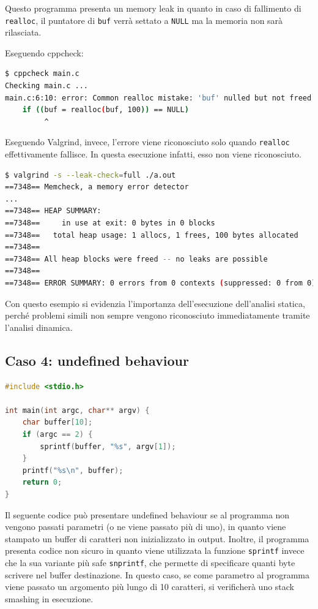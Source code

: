\documentclass{article}
\begin{document}
Questo programma presenta un memory leak in quanto in caso di fallimento
di \texttt{realloc}, il puntatore di \texttt{buf} verrà settato a \texttt{NULL}
ma la memoria non sarà rilasciata.

Eseguendo cppcheck:

\begin{lstlisting}[language=bash]
$ cppcheck main.c
Checking main.c ...
main.c:6:10: error: Common realloc mistake: 'buf' nulled but not freed upon failure [memleakOnRealloc]
    if ((buf = realloc(buf, 100)) == NULL)
         ^
\end{lstlisting}

Eseguendo Valgrind, invece, l'errore viene riconosciuto solo quando
\texttt{realloc} effettivamente fallisce. In questa esecuzione infatti, esso non
viene riconosciuto.

\begin{lstlisting}[language=bash]
$ valgrind -s --leak-check=full ./a.out 
==7348== Memcheck, a memory error detector
...
==7348== HEAP SUMMARY:
==7348==     in use at exit: 0 bytes in 0 blocks
==7348==   total heap usage: 1 allocs, 1 frees, 100 bytes allocated
==7348== 
==7348== All heap blocks were freed -- no leaks are possible
==7348== 
==7348== ERROR SUMMARY: 0 errors from 0 contexts (suppressed: 0 from 0)
\end{lstlisting}

Con questo esempio si evidenzia l'importanza dell'esecuzione dell'analisi
statica, perché problemi simili non sempre vengono riconosciuto immediatamente
tramite l'analisi dinamica.

\newpage
\subsection{Caso 4: undefined behaviour}
\label{sec:caso4}

\begin{lstlisting}[language=c]
#include <stdio.h>

int main(int argc, char** argv) {
    char buffer[10];
    if (argc == 2) {
        sprintf(buffer, "%s", argv[1]);
    }
    printf("%s\n", buffer);
    return 0;
}
\end{lstlisting}

Il seguente codice può presentare undefined behaviour se al programma non
vengono passati parametri (o ne viene passato più di uno), in quanto viene
stampato un buffer di caratteri non inizializzato in output. Inoltre, il
programma presenta codice non sicuro in quanto viene utilizzata la funzione
\texttt{sprintf} invece che la sua variante più safe \texttt{snprintf}, che
permette di specificare quanti byte scrivere nel buffer destinazione. In questo
caso, se come parametro al programma viene passato un argomento più lungo di 10
caratteri, si verificherà uno stack smashing in esecuzione. \\
\end{document}
